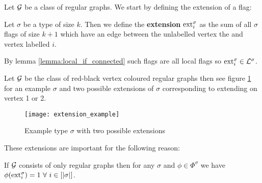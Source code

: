 Let $\mathcal{G}$ be a class of regular graphs.
We start by defining the extension of a flag:

\begin{definition}[Extension]
    Let $\sigma$ be a type of size $k$. Then we define the
    \textbf{extension} $\mathrm{ext}^\sigma_i$ as the sum of all $\sigma$ flags of
    size $k+1$ which have an edge between the unlabelled vertex the and vertex labelled $i$.
\end{definition}

\begin{note}
    By lemma \ref{lemma:local_if_connected} such flags are all local flags so
    $\mathrm{ext}^\sigma_i \in \mathcal{L}^\sigma$.
\end{note}

\begin{example}
    Let $\mathcal{G}$ be the class of red-black vertex coloured regular graphs then
    see figure \ref{fig:extension_example} for an example $\sigma$ and two possible
    extensions of $\sigma$ corresponding to extending on vertex 1 or 2.
    \begin{figure}[ht]
        \centering
        \texttt{[image: extension\_example]}
        \caption{Example type $\sigma$ with two possible extensions}
        \label{fig:extension_example}
    \end{figure}
\end{example}

These extensions are important for the following reason:

\begin{lemma}
    If $\mathcal{G}$ consists of only regular graphs then for any $\sigma$ and $\phi\in\Phi^\sigma$ we have
    $\phi(\mathrm{ext}_i^\sigma) = 1\ \forall\ i \in [|\sigma|]$.
\end{lemma}

